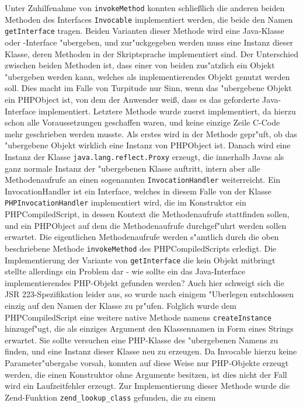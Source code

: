 Unter Zuhilfenahme von \texttt{invokeMethod} konnten schlie\ss lich die anderen beiden Methoden des Interfaces \texttt{Invocable} implementiert werden, die beide
den Namen \texttt{getInterface} tragen. Beiden Varianten dieser Methode wird eine Java-Klasse oder -Interface "ubergeben, und zur"uckgegeben werden muss eine 
Instanz dieser Klasse, deren Methoden in der Skriptsprache implementiert sind. Der Unterschied zwischen beiden Methoden ist, dass einer von beiden 
zus"atzlich ein Objekt "ubergeben werden kann, welches als implementierendes Objekt genutzt werden soll. Dies macht im Falle von Turpitude nur Sinn, wenn das 
"ubergebene Objekt ein PHPObject ist, von dem der Anwender wei\ss , dass es das geforderte Java-Interface implementiert. Letztere Methode wurde zuerst implementiert,
da hierzu schon alle Voraussetzungen geschaffen waren, und keine einzige Zeile C-Code mehr geschrieben werden musste. Als erstes wird in der Methode gepr"uft, ob
das "ubergebene Objekt wirklich eine Instanz von PHPObject ist. Danach wird eine Instanz der Klasse \texttt{java.lang.reflect.Proxy} erzeugt, die innerhalb Javas
als ganz normale Instanz der "ubergebenen Klasse auftritt, intern aber alle Methodenaufrufe an einen sogenannten \texttt{InvocationHandler} weiterreicht.
Ein InvocationHandler ist ein Interface, welches in diesem Falle von der Klasse \texttt{PHPInvocationHandler} implementiert wird, die im Konstruktor
ein PHPCompiledScript, in dessen Kontext die Methodenaufrufe stattfinden sollen, und ein PHPObject auf dem die Methodenaufrufe durchgef"uhrt werden sollen erwartet.
Die eigentlichen Methodenaufrufe werden s"amtlich durch die oben beschriebene Methode \texttt{invokeMethod} des PHPCompiledScripts erledigt.
Die Implementierung der Variante von \texttt{getInterface} die kein Objekt mitbringt stellte allerdings ein Problem dar - wie sollte ein das Java-Interface implementierendes
PHP-Objekt gefunden werden? Auch hier schweigt sich die JSR 223-Spezifikation leider aus, so wurde nach einigem "Uberlegen entschlossen einzig auf den Namen der Klasse zu
pr"ufen. Folglich wurde dem PHPCompiledScript eine weitere native Methode namens \texttt{createInstance} hinzugef"ugt, die als einziges Argument den 
Klassennamen in Form eines Strings erwartet. Sie sollte versuchen eine PHP-Klasse des "ubergebenen Namens zu finden, und eine Instanz dieser Klasse neu zu erzeugen.
Da Invocable hierzu keine Parameter"ubergabe vorsah, konnten auf diese Weise nur PHP-Objekte erzeugt werden, die einen Konstruktor ohne Argumente besitzen, ist 
dies nicht der Fall wird ein Laufzeitfehler erzeugt. Zur Implementierung dieser Methode wurde die Zend-Funktion \texttt{zend\_lookup\_class} gefunden, die zu einem
